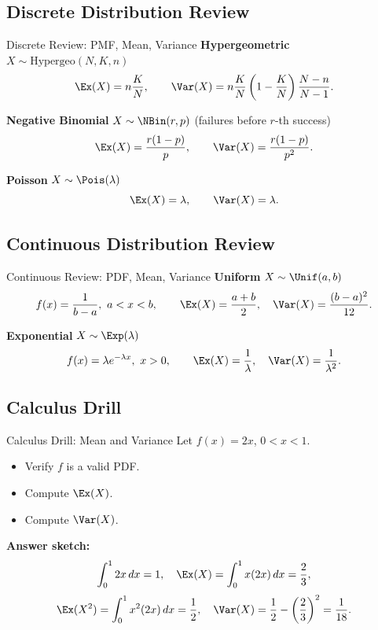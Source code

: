 \documentclass[aspectratio=169]{beamer}
\begin{document}
\subsection{Discrete Distribution Review}
\begin{frame}{Discrete Review: PMF, Mean, Variance}
  \textbf{Hypergeometric} \(X\sim\mathrm{Hypergeo}(N,K,n)\)
  \[
    \Ex(X)=n\frac{K}{N},\qquad
    \Var(X)=n\frac{K}{N}\left(1-\frac{K}{N}\right)\frac{N-n}{N-1}.
  \]

  \textbf{Negative Binomial} \(X\sim\NBin(r,p)\) (failures before \(r\)-th success)
  \[
    \Ex(X)=\frac{r(1-p)}{p},\qquad
    \Var(X)=\frac{r(1-p)}{p^2}.
  \]

  \textbf{Poisson} \(X\sim\Pois(\lambda)\)
  \[
    \Ex(X)=\lambda,\qquad \Var(X)=\lambda.
  \]
\end{frame}

\subsection{Continuous Distribution Review}
\begin{frame}{Continuous Review: PDF, Mean, Variance}
  \textbf{Uniform} \(X\sim\Unif(a,b)\)
  \[
    f(x)=\frac{1}{b-a},\ a<x<b,\qquad
    \Ex(X)=\frac{a+b}{2},\quad
    \Var(X)=\frac{(b-a)^2}{12}.
  \]

  \textbf{Exponential} \(X\sim\Exp(\lambda)\)
  \[
    f(x)=\lambda e^{-\lambda x},\ x>0,\qquad
    \Ex(X)=\frac{1}{\lambda},\quad
    \Var(X)=\frac{1}{\lambda^2}.
  \]
\end{frame}

\subsection{Calculus Drill}
\begin{frame}{Calculus Drill: Mean and Variance}
  Let \(f(x)=2x\), \(0<x<1\).
  \begin{itemize}
    \item Verify \(f\) is a valid PDF.
    \item Compute \(\Ex(X)\).
    \item Compute \(\Var(X)\).
  \end{itemize}
  \pause
  \textbf{Answer sketch:}
  \[
    \int_0^1 2x\,dx=1,\quad
    \Ex(X)=\int_0^1 x(2x)\,dx=\frac{2}{3},
  \]
  \[
    \Ex(X^2)=\int_0^1 x^2(2x)\,dx=\frac{1}{2},\quad
    \Var(X)=\frac{1}{2}-\left(\frac{2}{3}\right)^2=\frac{1}{18}.
  \]
\end{frame}
\end{document}
